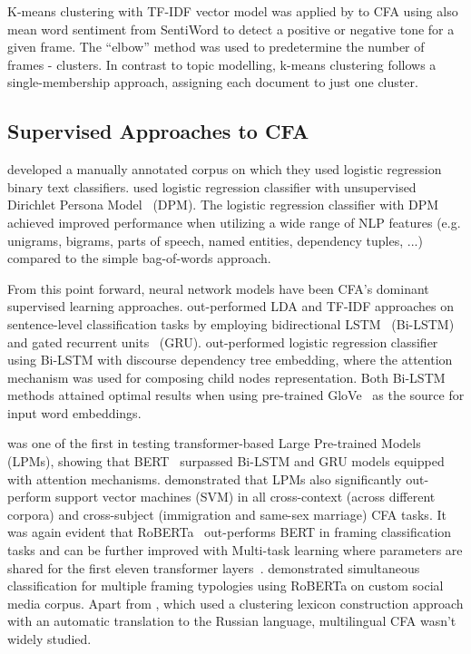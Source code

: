 K-means clustering with TF-IDF vector model was applied by \textcite{burscher2016frames} to CFA using also mean word sentiment from SentiWord to detect a positive or negative tone for a given frame. 
The ``elbow'' method was used to predetermine the number of frames - clusters.
In contrast to topic modelling, k-means clustering follows a single-membership approach, assigning each document to just one cluster.

\subsection{Supervised Approaches to CFA}
\textcite{boydstun2013identifying, boydstun2014tracking} developed a manually annotated corpus on which they used logistic regression binary text classifiers.
\textcite{card-etal-2016-analyzing} used logistic regression classifier with unsupervised Dirichlet Persona Model~\parencite{bamman-etal-2013-learning} (DPM). 
The logistic regression classifier with DPM achieved improved performance when utilizing a wide range of NLP features (e.g. unigrams, bigrams, parts of speech, named entities, dependency tuples, ...) compared to the simple bag-of-words approach. 

From this point forward, neural network models have been CFA's dominant supervised learning approaches.
\textcite{naderi-hirst-2017-classifying} out-performed LDA and TF-IDF approaches on sentence-level classification tasks by employing bidirectional LSTM~\parencite{hochreiter1997lstm, graves2013bilstm} (Bi-LSTM) and gated recurrent units~\parencite{cho-etal-2014-properties} (GRU).
\textcite{ji-smith-2017-neural} out-performed logistic regression classifier~\parencite{card-etal-2016-analyzing} using Bi-LSTM with discourse dependency tree embedding, where the attention mechanism was used for composing child nodes representation.
Both Bi-LSTM methods attained optimal results when using pre-trained GloVe~\parencite{pennington-etal-2014-glove} as the source for input word embeddings.

\textcite{liu-etal-2019-detecting} was one of the first in testing transformer-based Large Pre-trained Models (LPMs), showing that BERT~\parencite{devlin2018bert} surpassed Bi-LSTM and GRU models equipped with attention mechanisms.
\textcite{khanehzar-etal-2019-modeling} demonstrated that LPMs also significantly out-perform support vector machines (SVM) in all cross-context (across different corpora) and cross-subject (immigration and same-sex marriage) CFA tasks. 
It was again evident that RoBERTa~\parencite{liu2019roberta} out-performs BERT in framing classification tasks and can be further improved with Multi-task learning where parameters are shared for the first eleven transformer layers~\parencite{huguet-cabot-etal-2020-pragmatics}.
\textcite{mendelsohn-etal-2021-modeling} demonstrated simultaneous classification for multiple framing typologies using RoBERTa on custom social media corpus.
Apart from \textcite{field-etal-2018-framing}, which used a clustering lexicon construction approach with an automatic translation to the Russian language, multilingual CFA wasn't widely studied.

